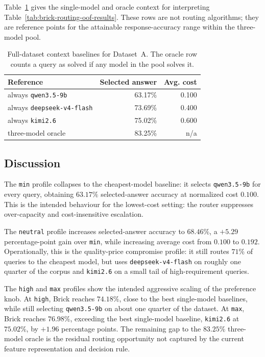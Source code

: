 Table~\ref{tab:brick-routing-baseline-context} gives the single-model and oracle
context for interpreting Table~\ref{tab:brick-routing-oof-results}. These rows
are not routing algorithms; they are reference points for the attainable
response-accuracy range within the three-model pool.

\begin{table}[ht]
\centering
\caption{Full-dataset context baselines for Dataset~A. The oracle row counts a
query as solved if any model in the pool solves it.}
\label{tab:brick-routing-baseline-context}
\small
\begin{tabular}{l r r}
\toprule
\textbf{Reference} & \textbf{Selected answer} & \textbf{Avg. cost} \\
\midrule
always \texttt{qwen3.5-9b}        & 63.17\% & 0.100 \\
always \texttt{deepseek-v4-flash} & 73.69\% & 0.400 \\
always \texttt{kimi2.6}           & 75.02\% & 0.600 \\
three-model oracle                & 83.25\% & n/a \\
\bottomrule
\end{tabular}
\end{table}

\subsection{Discussion}
\label{sec:routers-brick-discussion}

The \texttt{min} profile collapses to the cheapest-model baseline: it selects
\texttt{qwen3.5-9b} for every query, obtaining \(63.17\%\) selected-answer
accuracy at normalized cost \(0.100\). This is the intended behaviour for the
lowest-cost setting: the router suppresses over-capacity and cost-insensitive
escalation.

The \texttt{neutral} profile increases selected-answer accuracy to \(68.46\%\),
a \(+5.29\) percentage-point gain over \texttt{min}, while increasing average
cost from \(0.100\) to \(0.192\). Operationally, this is the quality-price
compromise profile: it still routes \(71\%\) of queries to the cheapest model,
but uses \texttt{deepseek-v4-flash} on roughly one quarter of the corpus and
\texttt{kimi2.6} on a small tail of high-requirement queries.

The \texttt{high} and \texttt{max} profiles show the intended aggressive scaling
of the preference knob. At \texttt{high}, Brick reaches \(74.18\%\), close to
the best single-model baselines, while still selecting \texttt{qwen3.5-9b} on
about one quarter of the dataset. At \texttt{max}, Brick reaches
\(\mathbf{76.98\%}\), exceeding the best single-model baseline,
\texttt{kimi2.6} at \(75.02\%\), by \(+1.96\) percentage points. The remaining
gap to the \(83.25\%\) three-model oracle is the residual routing opportunity
not captured by the current feature representation and decision rule.

